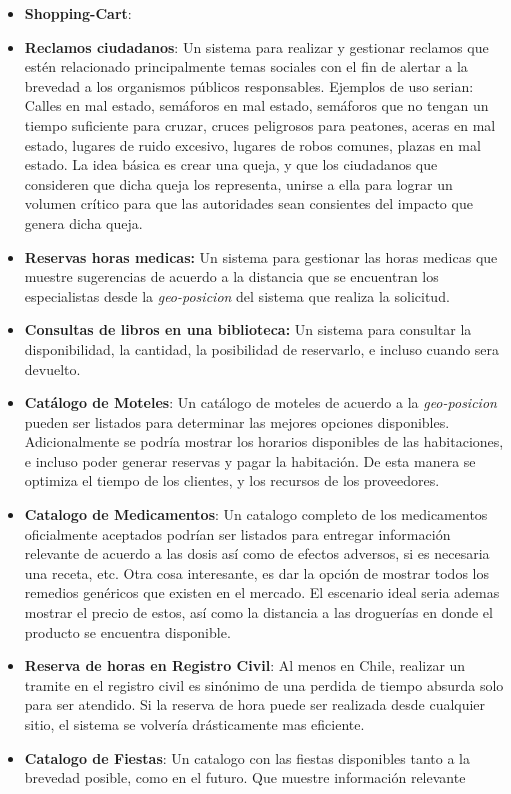 \begin{itemize}
	\item \textbf{Shopping-Cart}:
	
	\item \textbf{Reclamos ciudadanos}: Un sistema para realizar y gestionar reclamos que estén relacionado principalmente temas sociales con el fin de alertar a la brevedad a los organismos públicos responsables. Ejemplos de uso serian: Calles en mal estado, semáforos en mal estado, semáforos que no tengan un tiempo suficiente para cruzar, cruces peligrosos para peatones, aceras en mal estado, lugares de ruido excesivo, lugares de robos comunes, plazas en mal estado. La idea básica es crear una queja, y que los ciudadanos que consideren que dicha queja los representa, unirse a ella para lograr un volumen crítico para que las autoridades sean consientes del impacto que genera dicha queja.
	
	\item \textbf{Reservas horas medicas:} Un sistema para gestionar las horas medicas que muestre sugerencias de acuerdo a la distancia que se encuentran los especialistas desde la \textit{geo-posicion} del sistema que realiza la solicitud. 
	
	\item \textbf{Consultas de libros en una biblioteca:} Un sistema para consultar la disponibilidad, la cantidad, la posibilidad de reservarlo, e incluso cuando sera devuelto.
	\item \textbf{Catálogo de Moteles}: Un catálogo de moteles de acuerdo a la \textit{geo-posicion} pueden ser listados para determinar las mejores opciones disponibles. Adicionalmente se podría mostrar los horarios disponibles de las habitaciones, e incluso poder generar reservas y pagar la habitación. De esta manera se optimiza el tiempo de los clientes, y los recursos de los proveedores.
	
	\item \textbf{Catalogo de Medicamentos}: Un catalogo completo de los medicamentos oficialmente aceptados podrían ser listados para entregar información relevante de acuerdo a las dosis así como de efectos adversos, si es necesaria una receta, etc. Otra cosa interesante, es dar la opción de mostrar todos los remedios genéricos que existen en el mercado. El escenario ideal seria ademas mostrar el precio de estos, así como la distancia a las droguerías en donde el producto se encuentra disponible.
	
	\item \textbf{Reserva de horas en Registro Civil}: Al menos en Chile, realizar un tramite en el registro civil es sinónimo de una perdida de tiempo absurda solo para ser atendido. Si la reserva de hora puede ser realizada desde cualquier sitio, el sistema se volvería drásticamente mas eficiente.
	
	\item \textbf{Catalogo de Fiestas}: Un catalogo con las fiestas disponibles tanto a la brevedad posible, como en el futuro. Que muestre información relevante 
	
\end{itemize}

